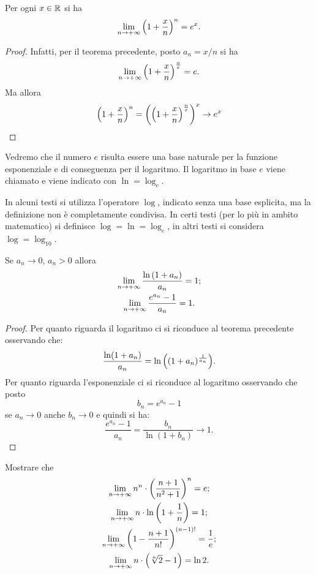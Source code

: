 \begin{corollary}%
\label{cor:limite_notevole_ex}%
\mymark{**}%
Per ogni $x\in \mathbb R$ si ha
\[
  \lim_{n\to +\infty} {\left( 1+ \frac x n \right)}^n = e^x.
\]
\end{corollary}
%
\begin{proof}
Infatti, per il teorema precedente, posto $a_n = x/n$ si ha
\[
\lim_{n\to +\infty}{\left( 1+\frac x n \right)}^{\frac n x} = e.
\]
Ma allora
\[
{\left( 1+ \frac x n \right)}^n = {\left( {\left( 1+\frac x n \right)}^{\frac n x} \right)}^x
\to e^x
\]
\end{proof}

\begin{definition}
Vedremo che il numero $e$ risulta essere una base naturale per la funzione
esponenziale e di conseguenza per il logaritmo. Il logaritmo in base
$e$ viene chiamato  e viene indicato con $\ln = \log_e$.
\end{definition}

In alcuni testi si utilizza l'operatore $\log$, indicato senza una base esplicita,
ma la definizione non è completamente condivisa.
In certi testi (per lo più in ambito matematico)
si definisce $\log  = \ln = \log_e$,
in altri testi si considera $\log = \log_{10}$.

\begin{corollary}\label{cor:limite_notevole_e}
\mymark{*}%
Se $a_n \to 0$, $a_n>0$ allora
\begin{gather}
 \lim_{n\to +\infty} \frac{\ln {\left( 1+ a_n \right)}}{a_n} = 1; \\
 \lim_{n\to +\infty} \frac{e^{a_n}-1}{a_n} = 1.
\end{gather}
\end{corollary}
%
\begin{proof}
Per quanto riguarda il logaritmo ci si riconduce al teorema precedente
osservando che:
\[
  \frac{\ln(1+a_n)}{a_n}
  = \ln {\left( (1+a_n)^{\frac 1 {a_n}} \right)}.
\]
Per quanto riguarda l'esponenziale ci si riconduce al logaritmo
osservando che posto
\[
  b_n = e^{a_n}-1
\]
se $a_n\to 0$ anche $b_n\to 0$ e quindi si ha:
\[
\frac{e^{a_n}-1}{a_n} = \frac{b_n}{\ln(1+b_n)} \to 1.
\]

\end{proof}

\begin{exercise}
Mostrare che
\begin{gather*}
  \lim_{n\to+\infty} n^n\cdot {\left( \frac{n+1}{n^2+1} \right)}^n = e; \\
  \lim_{n\to+\infty} n\cdot \ln{\left( 1 + \frac 1 n \right)} = 1; \\
  \lim_{n\to+\infty} {\left( 1-\frac{n+1}{n!} \right)}^{(n-1)!} = \frac 1 e; \\
  \lim_{n\to+\infty} n \cdot {\left( \sqrt[n]{2}-1 \right)} = \ln 2.
\end{gather*}
\end{exercise}

